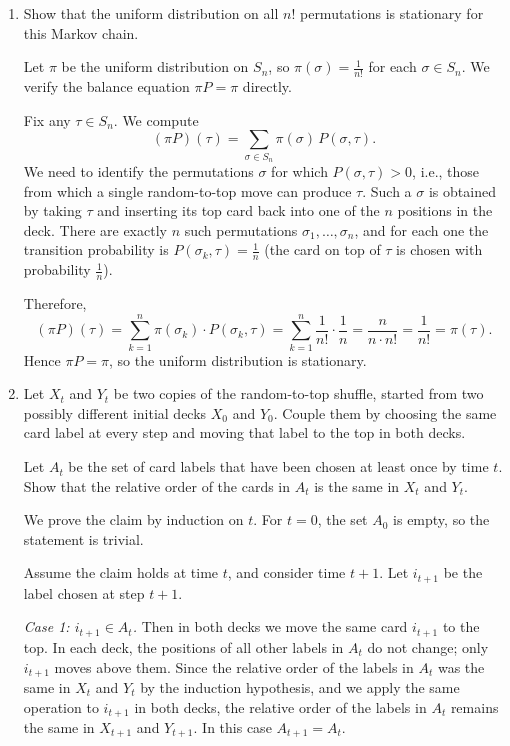 \documentclass[answers,12pt,addpoints]{exam}
\begin{document}
\begin{enumerate}
  \item Show that the uniform distribution on all $n!$ permutations is stationary for this Markov chain.

 \begin{solution}
  Let $\pi$ be the uniform distribution on $S_n$, so 
$\pi(\sigma) = \frac{1}{n!}$ for each $\sigma \in S_n$. We verify the 
balance equation $\pi P = \pi$ directly.

Fix any $\tau \in S_n$. We compute
\[
    (\pi P)(\tau) = \sum_{\sigma \in S_n} \pi(\sigma)\, P(\sigma, \tau).
\]
We need to identify the permutations $\sigma$ for which $P(\sigma, \tau) > 0$,
i.e., those from which a single random-to-top move can produce $\tau$.
Such a $\sigma$ is obtained by taking $\tau$ and inserting its top card back
into one of the $n$ positions in the deck. There are exactly $n$ such
permutations $\sigma_1, \ldots, \sigma_n$, and for each one the transition
probability is $P(\sigma_k, \tau) = \frac{1}{n}$ (the card on top of $\tau$
is chosen with probability $\frac{1}{n}$).

Therefore,
\[
    (\pi P)(\tau)
    = \sum_{k=1}^{n} \pi(\sigma_k)\cdot P(\sigma_k,\tau)
    = \sum_{k=1}^{n} \frac{1}{n!} \cdot \frac{1}{n}
    = \frac{n}{n \cdot n!}
    = \frac{1}{n!}
    = \pi(\tau).
\]
Hence $\pi P = \pi$, so the uniform distribution is stationary. 
 \end{solution} 

  \item Let $X_t$ and $Y_t$ be two copies of the random-to-top shuffle, started from two possibly different initial decks $X_0$ and $Y_0$. Couple them by choosing the same card label at every step and moving that label to the top in both decks.

  Let $A_t$ be the set of card labels that have been chosen at least once by time $t$. Show that the relative order of the cards in $A_t$ is the same in $X_t$ and $Y_t$.

  \begin{solution}
We prove the claim by induction on $t$. For $t = 0$, the set $A_0$ is
empty, so the statement is trivial.

Assume the claim holds at time $t$, and consider time $t+1$. Let $i_{t+1}$
be the label chosen at step $t+1$.

\medskip\noindent
\textit{Case 1: $i_{t+1} \in A_t$.}
Then in both decks we move the same card $i_{t+1}$ to the top. In each
deck, the positions of all other labels in $A_t$ do not change; only
$i_{t+1}$ moves above them. Since the relative order of the labels in
$A_t$ was the same in $X_t$ and $Y_t$ by the induction hypothesis, and
we apply the same operation to $i_{t+1}$ in both decks, the relative
order of the labels in $A_t$ remains the same in $X_{t+1}$ and $Y_{t+1}$.
In this case $A_{t+1} = A_t$.


\end{solution}
\end{enumerate}
\end{document}
